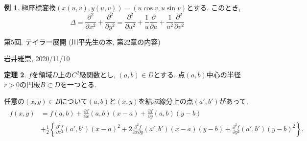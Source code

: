 \documentclass[dvipdfmx,a4paper,11pt]{article}
\theoremstyle{definition}
\newtheorem{thm}{定理}
\newtheorem{exa}[thm]{例}
\newcommand{\pdrv}[2]{\frac{\partial #1}{\partial #2}}
\newcommand{\ppdrv}[3]{\frac{\partial #1}{\partial #2 \partial #3}}
\begin{document}
    
 \begin{exa}
極座標変換$(x(u,v), y(u,v))  = (u \cos v, u \sin v)$とする.
このとき, 
$$
\Delta = \pdrv{^2}{x^2} + \pdrv{^2}{y^2} 
= \pdrv{^2}{u^2} + \frac{1}{u}\pdrv{}{u}  +  \frac{1}{u^2}\pdrv{^2}{v^2} 
$$
 \end{exa}
 
 \newpage
 \begin{center}
{\Large 第5回. テイラー展開 (川平先生の本, 第22章の内容)}
\end{center}

\begin{flushright}
 岩井雅崇, 2020/11/10
\end{flushright}


\begin{tcolorbox}[
    colback = white,
    colframe = green!35!black,
    fonttitle = \bfseries,
    breakable = true]
    \begin{thm}
    $f$を領域$D$上の$C^2$級関数とし, $(a,b)  \in D$とする.
    点$(a,b)$中心の半径$r>0$の円板$B \subset D$を一つとる.
    
    任意の$(x,y) \in B$について$(a,b)$と$(x,y) $を結ぶ線分上の点$(a',b')$があって,
  \begin{align*}
  \begin{split}
  f(x,y) &= f(a,b) + \pdrv{f}{x}(a,b)(x-a) + \pdrv{f}{y}(a,b)(y-b) \\
  &+ \frac{1}{2} \left\{  \pdrv{^2f}{x^2}(a',b')(x-a)^2 +2 \ppdrv{^2f}{x}{y}(a',b')(x-a)(y-b)+
   \pdrv{^2f}{y^2}(a',b')(y-b) ^2    \right\}.
    \end{split}
  \end{align*}

    \end{thm}
    \end{tcolorbox}
    
\end{document}
